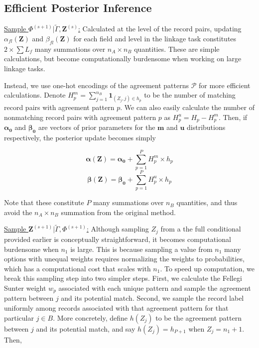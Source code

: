 \documentclass[12pt,letterpaper]{article}
\newcommand{\1}[1]{\mathbb{I}\!\left[#1\right]} %
\begin{document}
\hypertarget{efficient-posterior}{%
	\subsection{Efficient Posterior Inference }\label{efficient-posterior}}

\underline{Sample $\Phi^{(s+1)}|\tilde{\Gamma}, \bm{Z}^{(s)}$:} Calculated at the level of the record pairs, updating  \(\alpha_{fl}(\bm{Z})\) and \(\beta_{fl}(\bm{Z})\) for each field and level in the linkage task constitutes \(2 \times \sum L_f\) many summations over \(n_A \times n_B\) quantities. These are simple calculations, but become computationally burdensome when working on large linkage tasks. 

Instead, we use one-hot encodings of the agreement patterns $\mathcal{P}$ for more efficient calculations. Denote
$H_p^m = \sum_{j=1}^{n_B} \bm{1}_{(Z_j, j) \in h_p}$ to be the
number of matching record pairs with agreement pattern $p$. We can also easily calculate the number of nonmatching record pairs with agreement pattern $p$ as \(H_p^u = H_p - H_p^m\). Then, if $\bm{\alpha_0}$ and $\bm{\beta_0}$ are vectors of prior parameters for the $\bm{m}$ and $\bm{u}$ distributions respectively, the posterior update becomes simply

$$\bm{\alpha(Z)} = \bm{\alpha_0} + \sum_{p=1}^P H_p^m \times h_p$$
$$\bm{\beta(Z)} = \bm{\beta_0} + \sum_{p=1}^P H_p^u \times h_p$$

Note that these constitute \(P\) many summations over \(n_B\) quantities, and thus avoid the \(n_A \times n_B\) summation from the original method.

\underline{Sample $\bm{Z}^{(s+1)}|\tilde{\Gamma}, \Phi^{(s+1)}$:} Although sampling \(Z_j\) from a the
full conditional provided earlier is conceptually straightforward, it
becomes computational burdensome when $n_1$ is large. This is because sampling a value from $n_1$ many options with unequal weights requires normalizing the weights to probabilities, which has a computational cost that scales with $n_1$. To speed up
computation, we break this sampling step into two simpler steps. First,
we calculate the Fellegi Sunter weight \(w_{p}\) associated with each
unique pattern and sample the agreement pattern between \(j\) and its
potential match. Second, we sample the record label uniformly among
records associated with that agreement pattern for that particular
\(j\in B\). More concretely, define \(h(Z_j)\) to be the agreement
pattern between \(j\) and its potential match, and say
\(h(Z_j) = h_{P+1}\) when \(Z_j = n_1 + 1\). Then,
\end{document}
